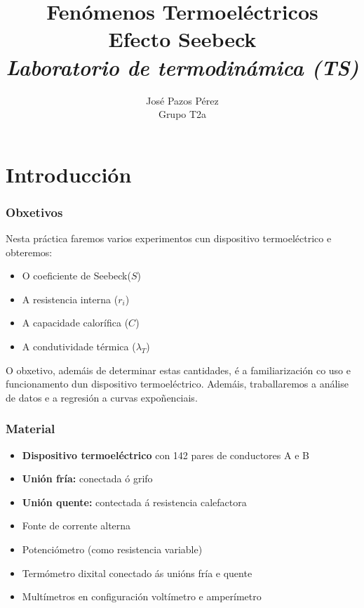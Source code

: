 \documentclass[12pt, a4paper, titlepage]{article}
\title{\textbf{Fenómenos Termoeléctricos\\\Huge{Efecto Seebeck}}\\\textbf{\large \textit{Laboratorio de termodinámica (TS)}}}
\author{{\Large José Pazos Pérez}\\Grupo T2a}
\date{}
\begin{document}
  \maketitle

  \tableofcontents


  \newpage
  \part{Introducción}

  \section{Obxetivos}

  Nesta práctica faremos varios experimentos cun dispositivo termoeléctrico e obteremos:

  \begin{itemize}
    \item O coeficiente de Seebeck($S$)
    \item A resistencia interna ($r_i$)
    \item A capacidade calorífica ($C$)
    \item A condutividade térmica ($\lambda_T$)
  \end{itemize}

  O obxetivo, ademáis de determinar estas cantidades, é a familiarización co uso e funcionamento dun dispositivo termoeléctrico. Ademáis, traballaremos a análise de datos e a regresión a curvas expoñenciais.


  \section{Material}

  \begin{itemize}
    \item \textbf{Dispositivo termoeléctrico} con 142 pares de conductores A e B
    \item \textbf{Unión fría:} conectada ó grifo
    \item \textbf{Unión quente:} contectada á resistencia calefactora
    \item Fonte de corrente alterna
    \item Potenciómetro (como resistencia variable)
    \item Termómetro dixital conectado ás unións fría e quente
    \item Multímetros en configuración voltímetro e amperímetro
  \end{itemize}
\end{document}
